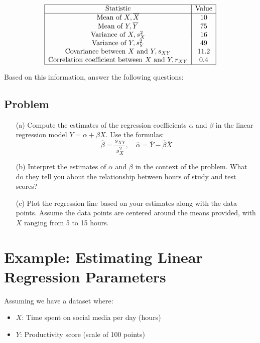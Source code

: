 \documentclass[11pt]{article}
\begin{document}
\[
\begin{array}{|c|c|}
\hline
\text{Statistic} & \text{Value} \\
\hline
\text{Mean of } X, \overline{X} & 10 \\
\text{Mean of } Y, \overline{Y} & 75 \\
\text{Variance of } X, s_X^2 & 16 \\
\text{Variance of } Y, s_Y^2 & 49 \\
\text{Covariance between } X \text{ and } Y, s_{XY} & 11.2 \\
\text{Correlation coefficient between } X \text{ and } Y, r_{XY} & 0.4 \\
\hline
\end{array}
\]

Based on this information, answer the following questions:

\subsection*{Problem}

\begin{itemize}
    \item[(a)] Compute the estimates of the regression coefficients \(\alpha\) and \(\beta\) in the linear regression model \(Y = \alpha + \beta X\). Use the formulas:
    \[
    \hat{\beta} = \frac{s_{XY}}{s_X^2}, \quad \hat{\alpha} = \overline{Y} - \hat{\beta} \overline{X}
    \]
    \item[(b)] Interpret the estimates of \(\alpha\) and \(\beta\) in the context of the problem. What do they tell you about the relationship between hours of study and test scores?
    \item[(c)] Plot the regression line based on your estimates along with the data points. Assume the data points are centered around the means provided, with \(X\) ranging from 5 to 15 hours.
\end{itemize}

\section{Example: Estimating Linear Regression Parameters}

Assuming we have a dataset where:
\begin{itemize}
    \item \(X\): Time spent on social media per day (hours)
    \item \(Y\): Productivity score (scale of 100 points)
\end{itemize}
\end{document}
